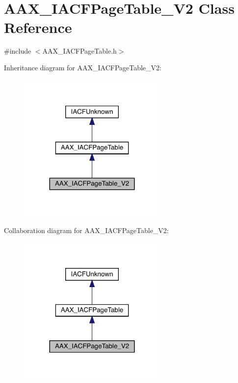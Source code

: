 \hypertarget{a01729}{}\section{A\+A\+X\+\_\+\+I\+A\+C\+F\+Page\+Table\+\_\+\+V2 Class Reference}
\label{a01729}


{\ttfamily \#include $<$A\+A\+X\+\_\+\+I\+A\+C\+F\+Page\+Table.\+h$>$}



Inheritance diagram for A\+A\+X\+\_\+\+I\+A\+C\+F\+Page\+Table\+\_\+\+V2\+:
\nopagebreak
\begin{figure}[H]
\begin{center}
\leavevmode
\includegraphics[width=209pt]{a01728}
\end{center}
\end{figure}


Collaboration diagram for A\+A\+X\+\_\+\+I\+A\+C\+F\+Page\+Table\+\_\+\+V2\+:
\nopagebreak
\begin{figure}[H]
\begin{center}
\leavevmode
\includegraphics[width=209pt]{a01727}
\end{center}
\end{figure}


